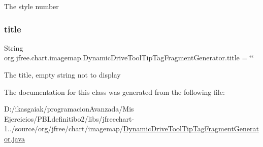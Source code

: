 The style number \mbox{\label{classorg_1_1jfree_1_1chart_1_1imagemap_1_1_dynamic_drive_tool_tip_tag_fragment_generator_a44b18cbee5e91278dce5646453e80300}} 
\subsubsection{\texorpdfstring{title}{title}}
{\footnotesize\ttfamily String org.\+jfree.\+chart.\+imagemap.\+Dynamic\+Drive\+Tool\+Tip\+Tag\+Fragment\+Generator.\+title = \char`\"{}\char`\"{}\hspace{0.3cm}{\ttfamily [protected]}}

The title, empty string not to display 

The documentation for this class was generated from the following file\+:\begin{DoxyCompactItemize}
\item 
D\+:/ikasgaiak/programacion\+Avanzada/\+Mis Ejercicios/\+P\+B\+Ldefinitibo2/libs/jfreechart-\/1../source/org/jfree/chart/imagemap/\mbox{\hyperlink{_dynamic_drive_tool_tip_tag_fragment_generator_8java}{Dynamic\+Drive\+Tool\+Tip\+Tag\+Fragment\+Generator.\+java}}\end{DoxyCompactItemize}
